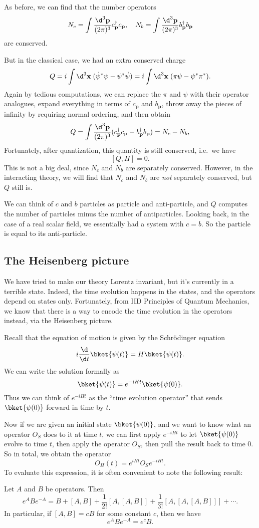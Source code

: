 \documentclass[a4paper]{article}
\begin{document}
As before, we can find that the number operators
\[
  N_c = \int \frac{\d^3 \mathbf{p}}{(2\pi)^3}c_\mathbf{p}^\dagger c_\mathbf{p},\quad N_b = \int \frac{\d^3 \mathbf{p}}{(2\pi)^3}b_\mathbf{p}^\dagger b_\mathbf{p}
\]
are conserved.

But in the classical case, we had an extra conserved charge
\[
  Q = i \int \d^3 \mathbf{x} \; (\dot{\psi}^* \psi - \psi^* \dot{\psi}) = i \int \d^3 \mathbf{x} \; (\pi \psi - \psi^* \pi^*).
\]
Again by tedious computations, we can replace the $\pi$ and $\psi$ with their operator analogues, expand everything in terms of $c_\mathbf{p}$ and $b_\mathbf{p}$, throw away the pieces of infinity by requiring normal ordering, and then obtain
\[
  Q = \int \frac{\d^3 \mathbf{p}}{(2\pi)^3} (c_\mathbf{p}^\dagger c_\mathbf{p} - b_\mathbf{p}^\dagger b_\mathbf{p}) = N_c - N_b,
\]
Fortunately, after quantization, this quantity is still conserved, i.e.\ we have
\[
  [Q, H] = 0.
\]
This is not a big deal, since $N_c$ and $N_b$ are separately conserved. However, in the interacting theory, we will find that $N_c$ and $N_b$ are \emph{not} separately conserved, but $Q$ still is.

We can think of $c$ and $b$ particles as particle and anti-particle, and $Q$ computes the number of particles minus the number of antiparticles. Looking back, in the case of a real scalar field, we essentially had a system with $c = b$. So the particle is equal to its anti-particle.

\subsection{The Heisenberg picture}
We have tried to make our theory Lorentz invariant, but it's currently in a terrible state. Indeed, the time evolution happens in the states, and the operators depend on states only. Fortunately, from IID Principles of Quantum Mechanics, we know that there is a way to encode the time evolution in the operators instead, via the Heisenberg picture.

Recall that the equation of motion is given by the Schr\"odinger equation
\[
  i \frac{\d}{\d t}\bket{\psi(t)} = H \bket{\psi(t)}.
\]
We can write the solution formally as
\[
  \bket{\psi(t)} = e^{-iHt} \bket{\psi(0)}.
\]
Thus we can think of $e^{-iHt}$ as the ``time evolution operator'' that sends $\bket{\psi(0)}$ forward in time by $t$.

Now if we are given an initial state $\bket{\psi(0)}$, and we want to know what an operator $O_S$ does to it at time $t$, we can first apply $e^{-iHt}$ to let $\bket{\psi(0)}$ evolve to time $t$, then apply the operator $O_S$, then pull the result back to time $0$. So in total, we obtain the operator
\[
  O_H(t) = e^{iHt} O_S e^{-iHt}.
\]
To evaluate this expression, it is often convenient to note the following result:
\begin{prop}
  Let $A$ and $B$ be operators. Then
  \[
    e^A B e^{-A} = B + [A, B] + \frac{1}{2!}[A, [A, B]] + \frac{1}{3!}[A, [A, [A, B]]] + \cdots.
  \]
  In particular, if $[A, B] = c B$ for some constant $c$, then we have
  \[
    e^A B e^{-A} = e^c B.
  \]
\end{prop}
\end{document}
